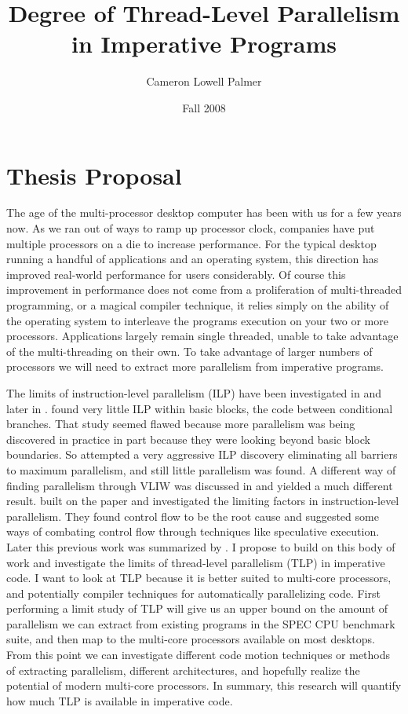 \documentclass[12pt,twoside,letterpaper]{article}
\title{Degree of Thread-Level Parallelism in Imperative Programs}
\author{Cameron Lowell Palmer}
\date{Fall 2008}
\begin{document}
\maketitle
\section*{Thesis Proposal}
The age of the multi-processor desktop computer has been with us for a few years now. As we ran out of ways to ramp up processor clock, companies have put multiple processors on a die to increase performance. For the typical desktop running a handful of applications and an operating system, this direction has improved real-world performance for users considerably. Of course this improvement in performance does not come from a proliferation of multi-threaded programming, or a magical compiler technique, it relies simply on the ability of the operating system to interleave the programs execution on your two or more processors. Applications largely remain single threaded, unable to take advantage of the multi-threading on their own. To take advantage of larger numbers of processors we will need to extract more parallelism from imperative programs.

The limits of instruction-level parallelism (ILP) have been investigated in \cite{Tjaden:1970p214} and later in \cite{Wall:1991p191}. \cite{Tjaden:1970p214} found very little ILP within basic blocks, the code between conditional branches. That study seemed flawed because more parallelism was being discovered in practice in part because they were looking beyond basic block boundaries. So \cite{Wall:1991p191} attempted a very aggressive ILP discovery eliminating all barriers to maximum parallelism, and still little parallelism was found. A different way of finding parallelism through VLIW was discussed in \cite{Nicolau:1984p217} and yielded a much different result. \cite{Lam:1992p188} built on the \cite{Wall:1991p191} paper and investigated the limiting factors in instruction-level parallelism. They found control flow to be the root cause and suggested some ways of combating control flow through techniques like speculative execution. Later this previous work was summarized by \cite{Rau:1992p211}. I propose to build on this body of work and investigate the limits of thread-level parallelism (TLP) in imperative code. I want to look at TLP because it is better suited to multi-core processors, and potentially compiler techniques for automatically parallelizing code. First performing a limit study of TLP will give us an upper bound on the amount of parallelism we can extract from existing programs in the SPEC CPU benchmark suite, and then map to the multi-core processors available on most desktops. From this point we can investigate different code motion techniques or methods of extracting parallelism, different architectures, and hopefully realize the potential of modern multi-core processors. In summary, this research will quantify how much TLP is available in imperative code.
\end{document}
